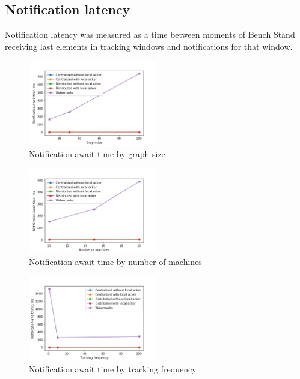 \subsection{Notification latency}

Notification latency was measured as a time between moments of Bench Stand receiving last elements in tracking windows and notifications for that window.

\begin{figure}[htbp]
  \centering
  \includegraphics[width=0.50\textwidth]{notification_await_time_by_graph_size.png}
  \caption{Notification await time by graph size}
\end{figure}
\begin{figure}[htbp]
  \centering
  \includegraphics[width=0.50\textwidth]{notification_await_time_by_number_of_machines.png}
  \caption{Notification await time by number of machines}
\end{figure}
\begin{figure}[htbp]
  \centering
  \includegraphics[width=0.50\textwidth]{notification_await_time_by_tracking_frequency.png}
  \caption{Notification await time by tracking frequency}
\end{figure}

